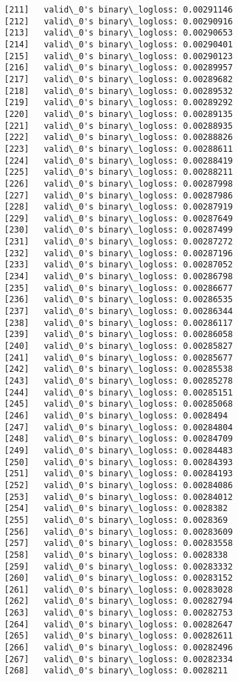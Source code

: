 \documentclass[11pt]{article}
\begin{document}
\begin{Verbatim}[commandchars=\\\{\}]
[211]	valid\_0's binary\_logloss: 0.00291146
[212]	valid\_0's binary\_logloss: 0.00290916
[213]	valid\_0's binary\_logloss: 0.00290653
[214]	valid\_0's binary\_logloss: 0.00290401
[215]	valid\_0's binary\_logloss: 0.00290123
[216]	valid\_0's binary\_logloss: 0.00289957
[217]	valid\_0's binary\_logloss: 0.00289682
[218]	valid\_0's binary\_logloss: 0.00289532
[219]	valid\_0's binary\_logloss: 0.00289292
[220]	valid\_0's binary\_logloss: 0.00289135
[221]	valid\_0's binary\_logloss: 0.00288935
[222]	valid\_0's binary\_logloss: 0.00288826
[223]	valid\_0's binary\_logloss: 0.00288611
[224]	valid\_0's binary\_logloss: 0.00288419
[225]	valid\_0's binary\_logloss: 0.00288211
[226]	valid\_0's binary\_logloss: 0.00287998
[227]	valid\_0's binary\_logloss: 0.00287986
[228]	valid\_0's binary\_logloss: 0.00287919
[229]	valid\_0's binary\_logloss: 0.00287649
[230]	valid\_0's binary\_logloss: 0.00287499
[231]	valid\_0's binary\_logloss: 0.00287272
[232]	valid\_0's binary\_logloss: 0.00287196
[233]	valid\_0's binary\_logloss: 0.00287052
[234]	valid\_0's binary\_logloss: 0.00286798
[235]	valid\_0's binary\_logloss: 0.00286677
[236]	valid\_0's binary\_logloss: 0.00286535
[237]	valid\_0's binary\_logloss: 0.00286344
[238]	valid\_0's binary\_logloss: 0.00286117
[239]	valid\_0's binary\_logloss: 0.00286058
[240]	valid\_0's binary\_logloss: 0.00285827
[241]	valid\_0's binary\_logloss: 0.00285677
[242]	valid\_0's binary\_logloss: 0.00285538
[243]	valid\_0's binary\_logloss: 0.00285278
[244]	valid\_0's binary\_logloss: 0.00285151
[245]	valid\_0's binary\_logloss: 0.00285068
[246]	valid\_0's binary\_logloss: 0.0028494
[247]	valid\_0's binary\_logloss: 0.00284804
[248]	valid\_0's binary\_logloss: 0.00284709
[249]	valid\_0's binary\_logloss: 0.00284483
[250]	valid\_0's binary\_logloss: 0.00284393
[251]	valid\_0's binary\_logloss: 0.00284193
[252]	valid\_0's binary\_logloss: 0.00284086
[253]	valid\_0's binary\_logloss: 0.00284012
[254]	valid\_0's binary\_logloss: 0.0028382
[255]	valid\_0's binary\_logloss: 0.0028369
[256]	valid\_0's binary\_logloss: 0.00283609
[257]	valid\_0's binary\_logloss: 0.00283558
[258]	valid\_0's binary\_logloss: 0.0028338
[259]	valid\_0's binary\_logloss: 0.00283332
[260]	valid\_0's binary\_logloss: 0.00283152
[261]	valid\_0's binary\_logloss: 0.00283028
[262]	valid\_0's binary\_logloss: 0.00282794
[263]	valid\_0's binary\_logloss: 0.00282753
[264]	valid\_0's binary\_logloss: 0.00282647
[265]	valid\_0's binary\_logloss: 0.00282611
[266]	valid\_0's binary\_logloss: 0.00282496
[267]	valid\_0's binary\_logloss: 0.00282334
[268]	valid\_0's binary\_logloss: 0.0028211

\end{Verbatim}
\end{document}
